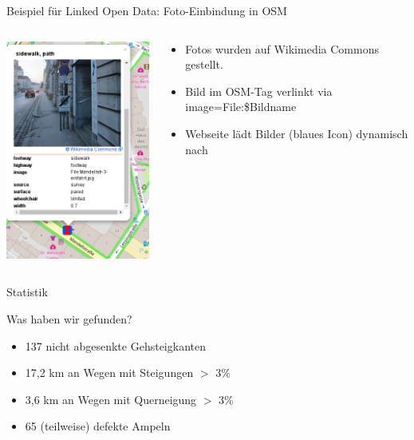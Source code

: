 \documentclass{beamer}
\begin{document}
\begin{frame}{Beispiel für Linked Open Data: Foto-Einbindung in OSM}

  \begin{columns}[c]
    \begin{column}[T]{.6\textwidth}

      \begin{center}
      \vspace{-1cm}
      \includegraphics[width=5.5cm]{Fotos-screenie.png}
      \end{center}

    \end{column}
    \begin{column}[T]{.4\textwidth}

      \begin{itemize}
        \item Fotos wurden auf Wikimedia Commons gestellt.
        \vspace{0.5cm}
        \item Bild im OSM-Tag verlinkt via image=File:\$Bildname 
        \vspace{0.5cm}
        \item Webseite lädt Bilder (blaues Icon) dynamisch nach
        \end{itemize}

    \end{column}
  \end{columns}

\end{frame}

\begin{frame}{Statistik}

  Was haben wir gefunden?

      \begin{itemize}
        \item 137 nicht abgesenkte Gehsteigkanten
        \item 17,2 km an Wegen mit Steigungen $>$ 3\%
        \item 3,6 km an Wegen mit Querneigung $>$ 3\%
        \item 65 (teilweise) defekte Ampeln
      \end{itemize}
        
\end{frame}
\end{document}
